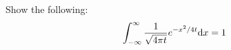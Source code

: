 \item Show the following:
%
\begin{align*}
  \int^\infty_{-\infty} \frac{1}{\sqrt{4 \pi t}} e^{-x^2/4t} \text dx & = 1
\end{align*}
\bigbreak
